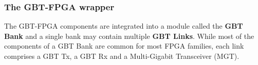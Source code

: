 \subsubsection{The GBT-FPGA wrapper}
The GBT-FPGA components are integrated into a module called the \textbf{GBT Bank} and a single bank may contain multiple \textbf{GBT Links}. While most of the components of a GBT Bank are common for most FPGA families, each link comprises a GBT Tx, a GBT Rx and a Multi-Gigabit Transceiver (MGT). 